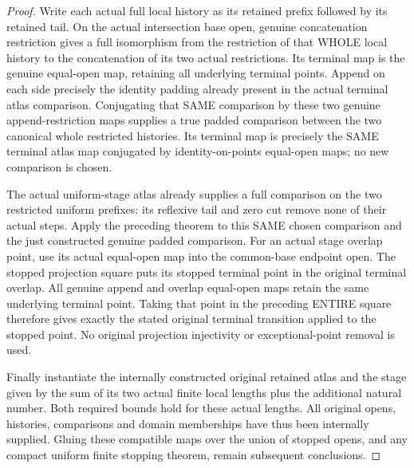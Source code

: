 \begin{proof}
Write each actual full local history as its retained prefix followed
by its retained tail. On the actual intersection base open, genuine
concatenation restriction gives a full isomorphism from the restriction
of that WHOLE local history to the concatenation of its two actual
restrictions. Its terminal map is the genuine equal-open map, retaining
all underlying terminal points. Append on each side precisely the
identity padding already present in the actual terminal atlas
comparison. Conjugating that SAME comparison by these two genuine
append-restriction maps supplies a true padded comparison between the
two canonical whole restricted histories. Its terminal map is precisely
the SAME terminal atlas map conjugated by identity-on-points equal-open
maps; no new comparison is chosen.

The actual uniform-stage atlas already supplies a full comparison on
the two restricted uniform prefixes: its reflexive tail and zero cut
remove none of their actual steps. Apply the preceding theorem to this
SAME chosen comparison and the just constructed genuine padded comparison.
For an actual stage overlap point, use its actual equal-open map into
the common-base endpoint open. The stopped projection square puts its
stopped terminal point in the original terminal overlap. All genuine
append and overlap equal-open maps retain the same underlying terminal
point. Taking that point in the preceding ENTIRE square therefore gives
exactly the stated original terminal transition applied to the stopped
point. No original projection injectivity or exceptional-point removal
is used.

Finally instantiate the internally constructed original retained atlas
and the stage given by the sum of its two actual finite local lengths
plus the additional natural number. Both required bounds hold for these
actual lengths. All original opens, histories, comparisons and domain
memberships have thus been internally supplied. Gluing these compatible
maps over the union of stopped opens, and any compact uniform finite
stopping theorem, remain subsequent conclusions.
\end{proof}
